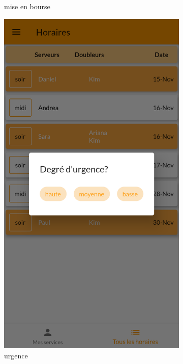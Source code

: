 \begin{figure}[!h]
\begin{subfigure}{.3\textwidth}
            \caption{mise en bourse}
            \label{fig:mise_en_bourse}
        \end{subfigure}
        \begin{subfigure}{.3\textwidth}
            \centering
            \includegraphics[width=0.9\linewidth]{screenshots/scenario_02/urgence.png}
            \caption{urgence}
            \label{fig:urgence}
        \end{subfigure}
        \begin{subfigure}{.3\textwidth}
            \centering

\end{subfigure}
\end{figure}
